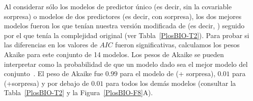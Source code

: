 
Al considerar sólo los modelos de predictor único (es decir, sin la covariable sorpresa) o modelos de dos predictores (es decir, con sorpresa), los dos mejores modelos fueron los que tenían nuestra versión modificada de \mdlbin (es decir, \mdlbinfrag) seguido por el que tenía la complejidad \mdlbin original (ver Tabla~\ref{PlosBIO-T2}). Para probar si las diferencias en los valores de $AIC$ fueron significativas, calculamos los pesos Akaike para este conjunto de 14 modelos. Los pesos de Akaike se pueden interpretar como la probabilidad de que un modelo dado sea el mejor modelo del conjunto~\cite{f106}. El peso de Akaike fue $0.99$ para el modelo de \mdlbinfrag (+ sorpresa), $0.01$ para \mdlbin (+sorpresa) y por debajo de $0.01$ para todos los demás modelos (consultar la Tabla~\ref{PlosBIO-T2} y la Figura~\ref{PlosBIO-F8}A).

